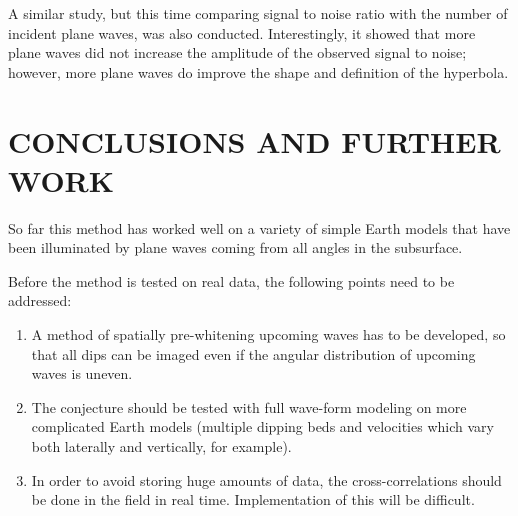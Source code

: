 A similar study, but this time comparing signal to noise ratio with the 
number of incident plane waves, was also conducted.  Interestingly, 
it showed that more plane waves did not increase the amplitude of the 
observed signal to noise; however, more plane waves do 
improve the shape and definition of the hyperbola.

\section{CONCLUSIONS AND FURTHER WORK}

So far this method has worked well on a variety of simple Earth models 
that have been illuminated by plane waves coming from all angles in 
the subsurface.

Before the method is tested on real data, the following points need to be 
addressed:
\begin{enumerate}
\item
A method of spatially pre-whitening upcoming waves has to be developed, so 
that all dips can be imaged even if the angular distribution of 
upcoming waves is uneven.
\item
The conjecture should be tested with full wave-form modeling 
on more complicated Earth models (multiple dipping beds and 
velocities which vary both laterally and vertically, for example).
\item
In order to avoid storing huge amounts of data, the cross-correlations should
be done in the field in real time.  Implementation of this will be difficult.
\end{enumerate}









